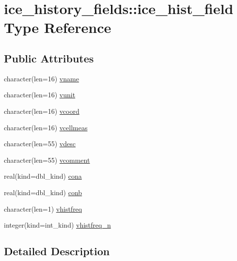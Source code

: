 \hypertarget{typeice__history__fields_1_1ice__hist__field}{
\section{ice\_\-history\_\-fields::ice\_\-hist\_\-field Type Reference}
\label{typeice__history__fields_1_1ice__hist__field}
}
\subsection*{Public Attributes}
\begin{DoxyCompactItemize}
\item 
character(len=16) \hyperlink{typeice__history__fields_1_1ice__hist__field_a7f72b9a3cd90b1af48cf8e455ccd8f3c}{vname}
\item 
character(len=16) \hyperlink{typeice__history__fields_1_1ice__hist__field_ac72b8c03aabe26919c0113a4430736d4}{vunit}
\item 
character(len=16) \hyperlink{typeice__history__fields_1_1ice__hist__field_a71b2470ab85a9fc5cd066d1cf5abb119}{vcoord}
\item 
character(len=16) \hyperlink{typeice__history__fields_1_1ice__hist__field_a42bf1015001f3f3008bf6034839f7085}{vcellmeas}
\item 
character(len=55) \hyperlink{typeice__history__fields_1_1ice__hist__field_a630f9712d30236f4011a6b0395ef2ac3}{vdesc}
\item 
character(len=55) \hyperlink{typeice__history__fields_1_1ice__hist__field_a7c59735f84c14cdcf0daeb2b9be6ddd5}{vcomment}
\item 
real(kind=dbl\_\-kind) \hyperlink{typeice__history__fields_1_1ice__hist__field_ad87bd5af63226c5310b36674ea09b84a}{cona}
\item 
real(kind=dbl\_\-kind) \hyperlink{typeice__history__fields_1_1ice__hist__field_acbb7efe62964caef752563e088014427}{conb}
\item 
character(len=1) \hyperlink{typeice__history__fields_1_1ice__hist__field_aff4b72a08bea525266b3525041667203}{vhistfreq}
\item 
integer(kind=int\_\-kind) \hyperlink{typeice__history__fields_1_1ice__hist__field_a9ffe2d3c9f280e42e9dedc8ef6ab13f9}{vhistfreq\_\-n}
\end{DoxyCompactItemize}


\subsection{Detailed Description}



